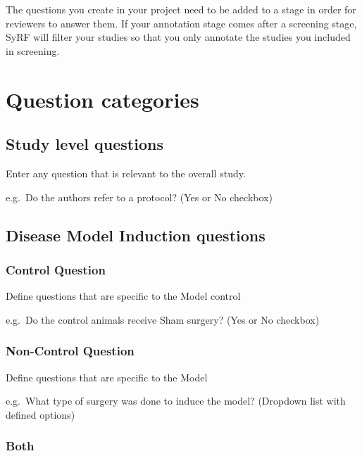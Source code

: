 \documentclass[
]{book}
\begin{document}
The questions you create in your project need to be added to a stage in order for reviewers to answer them. If your annotation stage comes after a screening stage, SyRF will filter your studies so that you only annotate the studies you included in screening.

\hypertarget{question-categories}{%
\section{Question categories}\label{question-categories}}

\hypertarget{study-level-questions}{%
\subsection{Study level questions}\label{study-level-questions}}

Enter any question that is relevant to the overall study.

e.g.~Do the authors refer to a protocol?
(Yes or No checkbox)

\hypertarget{disease-model-induction-questions}{%
\subsection{Disease Model Induction questions}\label{disease-model-induction-questions}}

\hypertarget{control-question}{%
\subsubsection{Control Question}\label{control-question}}

Define questions that are specific to the Model control

e.g.~Do the control animals receive Sham surgery?
(Yes or No checkbox)

\hypertarget{non-control-question}{%
\subsubsection{Non-Control Question}\label{non-control-question}}

Define questions that are specific to the Model

e.g.~What type of surgery was done to induce the model?
(Dropdown list with defined options)

\hypertarget{both}{%
\subsubsection{Both}\label{both}}
\end{document}

